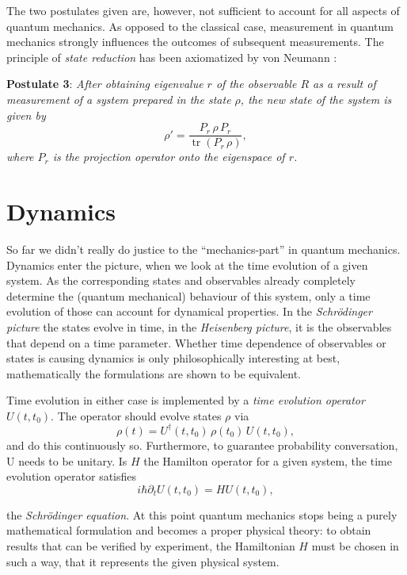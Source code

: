 \documentclass[a4paper]{amsart}            %
\DeclareMathOperator{\tr}{tr}
\theoremstyle{plain}                                               %
\begin{document}
The two postulates given are, however, not sufficient to account for all aspects of quantum mechanics. As opposed to the classical case, measurement in quantum mechanics strongly influences the outcomes of subsequent measurements. The principle of \emph{state reduction} has been axiomatized by von Neumann \cite{neumann}:

\newpage
\textbf{Postulate 3}: \itshape After obtaining eigenvalue $r$ of the observable $R$ as a result of measurement of a system prepared in the state $\rho$, the new state of the system is given by \[\rho' = \frac{P_r\,\rho\,P_r}{\tr(P_r\,\rho)},\]  where $P_r$ is the projection operator onto the eigenspace of $r$.   \upshape

\vspace{0.47cm}
\section*{\textbf{Dynamics}}

So far we didn't really do justice to the \enquote{mechanics-part} in quantum mechanics. Dynamics enter the picture, when we look at the time evolution of a given system. As the corresponding states and observables already completely determine the (quantum mechanical) behaviour of this system, only a time evolution of those can account for dynamical properties. In the \emph{Schrödinger picture} the states evolve in time, in the \emph{Heisenberg picture}, it is the observables that depend on a time parameter. Whether time dependence of observables or states is causing dynamics is only philosophically interesting at best, mathematically the formulations are shown to be equivalent.

Time evolution in either case is implemented by a \emph{time evolution operator} $U(t,t_0)$. The operator should evolve states $\rho$ via
\[
\rho(t) = U^{\dagger}(t,t_0)\, \rho(t_0)\, U(t,t_0),
\]
and do this continuously so. Furthermore, to guarantee probability conversation, U needs to be unitary. Is $H$ the Hamilton operator for a given system, the time evolution operator satisfies
\vspace{0.4cm}
\[
i\hbar \partial_t U(t,t_0) = H U(t,t_0),
\]

the \emph{Schrödinger equation}. At this point quantum mechanics stops being a purely mathematical formulation and becomes a proper physical theory: to obtain results that can be verified by experiment, the Hamiltonian $H$ must be chosen in such a way, that it represents the given physical system. 

\bigskip
\bigskip
\bigskip
\bigskip
\parskip 5pt
\printbibliography
\end{document}

